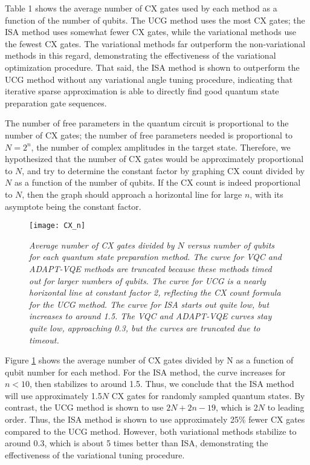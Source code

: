 \documentclass{article}
\begin{document}
Table 1 shows the average number of CX gates used by each method as a function
of the number of qubits. The UCG method uses the most CX gates; the ISA method
uses somewhat fewer CX gates, while the variational methods use the fewest
CX gates. The variational methods far outperform the non-variational methods
in this regard, demonstrating the effectiveness of the variational optimization
procedure. That said, the ISA method is shown to outperform the UCG method
without any variational angle tuning procedure, indicating that iterative sparse
approximation is able to directly find good quantum state preparation gate
sequences.

The number of free parameters in the quantum circuit is proportional to the
number of CX gates; the number of free parameters needed is proportional to
$N = 2^n$, the number of complex amplitudes in the target state. Therefore, we
hypothesized that the number of CX gates would be approximately proportional
to $N$, and try to determine the constant factor by graphing CX count divided by
$N$ as a function of the number of qubits. If the CX count is indeed
proportional to $N$, then the graph should approach a horizontal line for large
$n$, with its asymptote being the constant factor.

\begin{figure}[H]
\texttt{[image: CX\_n]}
\caption{\textit{Average number of CX gates divided by $N$ versus number of qubits for
each quantum state preparation method. The curve for VQC and ADAPT-VQE methods
are truncated because these methods timed out for larger numbers of qubits. The
curve for UCG is a nearly horizontal line at constant factor 2, reflecting the
CX count formula for the UCG method. The curve for ISA starts out quite low, but
increases to around 1.5. The VQC and ADAPT-VQE curves stay quite low,
approaching 0.3, but the curves are truncated due to timeout.}}
\label{fig:CX_n}
\end{figure}

Figure \ref{fig:CX_n} shows the average number of CX gates divided by N as a function of
qubit number for each method. For the ISA method, the curve increases for 
$n < 10$, then stabilizes to around 1.5. Thus, we conclude that the ISA method
will use approximately 1.5$N$ CX gates for randomly sampled quantum states.
By contrast, the UCG method is shown to use $2N + 2n - 19$, which is 2$N$ to
leading order. Thus, the ISA method is shown to use approximately 25\% fewer
CX gates compared to the UCG method. However, both variational methods
stabilize to around 0.3, which is about 5 times better than ISA, demonstrating
the effectiveness of the variational tuning procedure.
\end{document}
